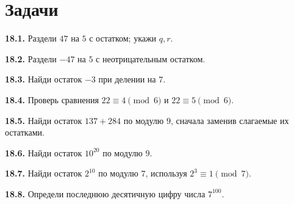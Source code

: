 \section*{Задачи}
\begingroup\setlength{\parskip}{2pt}
\noindent\begin{minipage}[t]{\linewidth}\textbf{18.1.} Раздели \(47\) на \(5\) с остатком; укажи \(q,r\).\par\end{minipage}\par
\noindent\begin{minipage}[t]{\linewidth}\textbf{18.2.} Раздели \(-47\) на \(5\) с неотрицательным остатком.\par\end{minipage}\par
\noindent\begin{minipage}[t]{\linewidth}\textbf{18.3.} Найди остаток \(-3\) при делении на \(7\).\par\end{minipage}\par
\noindent\begin{minipage}[t]{\linewidth}\textbf{18.4.} Проверь сравнения \(22\equiv4\pmod6\) и \(22\equiv5\pmod6\).\par\end{minipage}\par
\noindent\begin{minipage}[t]{\linewidth}\textbf{18.5.} Найди остаток \(137+284\) по модулю \(9\), сначала заменив слагаемые их остатками.\par\end{minipage}\par
\noindent\begin{minipage}[t]{\linewidth}\textbf{18.6.} Найди остаток \(10^{20}\) по модулю \(9\).\par\end{minipage}\par
\noindent\begin{minipage}[t]{\linewidth}\textbf{18.7.} Найди остаток \(2^{10}\) по модулю \(7\), используя \(2^3\equiv1\pmod7\).\par\end{minipage}\par
\noindent\begin{minipage}[t]{\linewidth}\textbf{18.8.} Определи последнюю десятичную цифру числа \(7^{100}\).\par\end{minipage}\par

